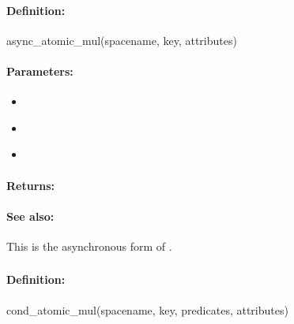 \paragraph{Definition:}
\begin{rubycode}
async_atomic_mul(spacename, key, attributes)
\end{rubycode}

\paragraph{Parameters:}
\begin{itemize}[noitemsep]
\item {}\\

\item {}\\

\item {}\\

\end{itemize}

\paragraph{Returns:}


\paragraph{See also:}  This is the asynchronous form of .

\pagebreak
\subsubsection{}
\label{api:ruby:cond_atomic_mul}


\paragraph{Definition:}
\begin{rubycode}
cond_atomic_mul(spacename, key, predicates, attributes)
\end{rubycode}

